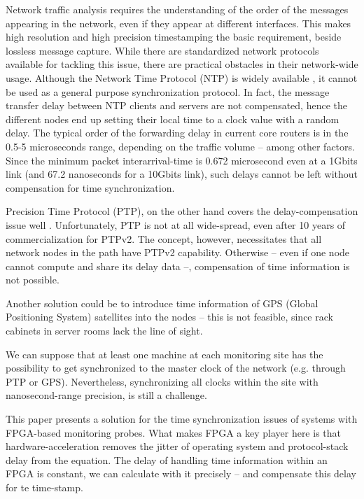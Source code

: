 \documentclass[journal]{IEEEtran}
\begin{document}
Network traffic analysis requires the understanding of the order of the messages appearing in the network, even if they appear at different interfaces. This makes high resolution and high precision timestamping the basic requirement, beside lossless message capture. 
While there are standardized network protocols available for tackling this issue, there are practical obstacles in their network-wide usage. Although the Network Time Protocol (NTP) is widely available \cite{NTP_standard}, it cannot be used as a general purpose synchronization protocol. In fact, the message transfer delay between NTP clients and servers are not compensated, hence the different nodes end up setting their local time to a clock value with a random delay. The typical order of the forwarding delay in current core routers is in the 0.5-5 microseconds range, depending on the traffic volume -- among other factors. Since the minimum packet interarrival-time is 0.672 microsecond even at a 1Gbit\/s link (and 67.2 nanoseconds for a 10Gbit\/s link), such delays cannot be left without compensation for time synchronization.

Precision Time Protocol (PTP), on the other hand covers the delay-compensation issue well \cite{PTP_standard}. Unfortunately, PTP is not at all wide-spread, even after 10 years of commercialization for PTPv2. The concept, however, necessitates that all network nodes in the path have PTPv2 capability. Otherwise -- even if one node cannot compute and share its delay data --, compensation of time information is not possible.

Another solution could be to introduce time information of GPS (Global Positioning System) satellites into the nodes -- this is not feasible, since rack cabinets in server rooms lack the line of sight.

We can suppose that at least one machine at each monitoring site has the possibility to get synchronized to the master clock of the network (e.g. through PTP or GPS). Nevertheless, synchronizing all clocks within the site with nanosecond-range precision, is still a challenge.

This paper presents a solution for the time synchronization issues of systems with FPGA-based monitoring probes. What makes FPGA a key player here is that hardware-acceleration removes the jitter of operating system and protocol-stack delay from the equation. The delay of handling time information within an FPGA is constant, we can calculate with it precisely -- and compensate this delay for te time-stamp.
\end{document}
